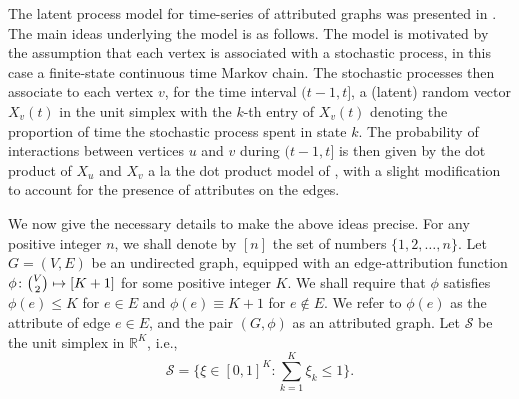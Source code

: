 \documentclass[10pt,draftclsnofoot,onecolumn]{IEEEtran}
\theoremstyle{definition}
\begin{document}
The latent process model for time-series of attributed graphs was
presented in \cite{lee11}. The main ideas underlying the model is as
follows. The model is motivated by the assumption that each vertex is
associated with a stochastic process, in this case a finite-state
continuous time Markov chain. The stochastic processes then associate
to each vertex $v$, for the time interval $(t-1,t]$, a (latent) random
vector $X_v(t)$ in the unit simplex with the $k$-th entry of $X_v(t)$
denoting the proportion of time the stochastic process spent in state
$k$. The probability of interactions between vertices $u$
and $v$ during $(t-1, t]$ is then given by the dot product of $X_u$
and $X_v$ a la the dot product model of \cite{young07:_random}, with a
slight modification to account for the presence of attributes on the
edges.

We now give the necessary details to make the above ideas precise. For
any positive integer $n$, we shall denote by $[n]$ the set of numbers
$\{1,2,\dots,n\}$. Let $G = (V,E)$ be an undirected graph, equipped
with an edge-attribution function $\phi \colon \tbinom{V}{2} \mapsto
[K+1]$ for some positive integer $K$. We shall require that $\phi$
satisfies $\phi(e) \leq K$ for $e \in E$ and $\phi(e) \equiv K+1$ for
$e \not \in E$. We refer to $\phi(e)$ as the attribute of edge $e \in
E$, and the pair $(G,\phi)$ as an attributed graph. Let $\mathscr{S}$
be the unit simplex in $\mathbb{R}^{K}$, i.e.,
\begin{equation}
  \mathscr{S} = \{ \xi \in [0,1]^{K}
  \colon \sum_{k = 1}^{K} \xi_k \leq 1 \}.
\end{equation}
\end{document}
